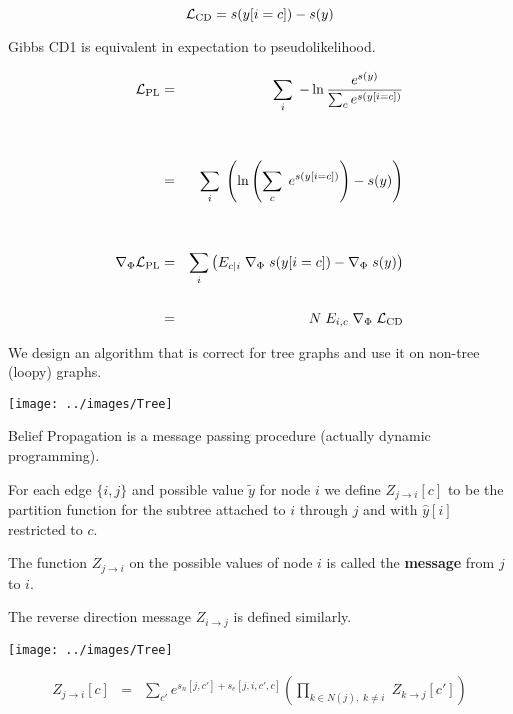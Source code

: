 {\vfill
{\color{red} $${\cal L}_{\mathrm{CD}}  = s(y[i=c]) - s(y)$$}


Gibbs CD1 is equivalent in expectation to pseudolikelihood.

{\huge
\begin{eqnarray*}
{\cal L}_{\mathrm{PL}} & = & \sum_i \; - \ln \frac{e^{s(y)}}{\sum_c e^{s(y[i=c])}} \\
\\
\\
& = & \sum_i\; \left(\ln \left(\sum_c \;e^{s(y[i=c])}\right) - s(y)\right) \\
\\
\\
\nabla_\Phi {\cal L}_{\mathrm{PL}} & = & \sum_i \left(E_{c|i}\; \nabla_\Phi\;s(y[i=c]) - \nabla_\Phi\; s(y)\right) \\
\\
& = & N \;E_{i,c}\; \nabla_\Phi \; {\cal L}_{\mathrm{CD}}
\end{eqnarray*}
}


We design an algorithm that is correct for tree graphs and use it on non-tree (loopy) graphs.


\centerline{\texttt{[image: ../images/Tree]}}

\vfill
Belief Propagation is a message passing procedure (actually dynamic programming).

\vfill
For each edge $\{i,j\}$ and possible value $\tilde{y}$ for node $i$ we define {\color{red} $Z_{j \rightarrow i}[c]$}
to be  the partition function for the subtree attached to $i$ through $j$ and
with $\hat{y}[i]$ restricted to $c$.

\vfill
The function $Z_{j \rightarrow i}$ on the possible values of node $i$ is called the {\bf message} from $j$ to $i$.

\vfill
The reverse direction message $Z_{i \rightarrow j}$ is defined similarly.


\centerline{\texttt{[image: ../images/Tree]}}

\vfill
\begin{eqnarray*}
  Z_{j\rightarrow i}[c] & = & \sum_{c'}  e^{s_n[j,c'] + s_e[j,i,c',c]}
    \left(\prod_{k \in N(j),\;k \not = i}\;Z_{k\rightarrow j}[c']\right)
\end{eqnarray*}

}
